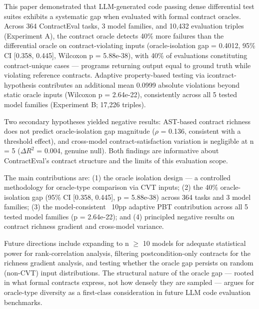
This paper demonstrated that LLM-generated code passing dense differential test suites exhibits a systematic gap when evaluated with formal contract oracles. Across 364 ContractEval tasks, 3 model families, and 10,432 evaluation triples (Experiment A), the contract oracle detects 40\% more failures than the differential oracle on contract-violating inputs (oracle-isolation gap = 0.4012, 95\% CI [0.358, 0.445], Wilcoxon p = 5.88e-38), with 40\% of evaluations constituting contract-unique cases --- programs returning output equal to ground truth while violating reference contracts. Adaptive property-based testing via icontract-hypothesis contributes an additional mean 0.0999 absolute violations beyond static oracle inputs (Wilcoxon p = 2.64e-22), consistently across all 5 tested model families (Experiment B; 17,226 triples).

Two secondary hypotheses yielded negative results: AST-based contract richness does not predict oracle-isolation gap magnitude ($\rho$ = 0.136, consistent with a threshold effect), and cross-model contract-satisfaction variation is negligible at n = 5 ($\Delta R^2$ = 0.004, genuine null). Both findings are informative about ContractEval's contract structure and the limits of this evaluation scope.

The main contributions are: (1) the oracle isolation design --- a controlled methodology for oracle-type comparison via CVT inputs; (2) the 40\% oracle-isolation gap (95\% CI [0.358, 0.445], p = 5.88e-38) across 364 tasks and 3 model families; (3) the model-consistent ~10pp adaptive PBT contribution across all 5 tested model families (p = 2.64e-22); and (4) principled negative results on contract richness gradient and cross-model variance.

Future directions include expanding to n $\geq$ 10 models for adequate statistical power for rank-correlation analysis, filtering postcondition-only contracts for the richness gradient analysis, and testing whether the oracle gap persists on random (non-CVT) input distributions. The structural nature of the oracle gap --- rooted in what formal contracts express, not how densely they are sampled --- argues for oracle-type diversity as a first-class consideration in future LLM code evaluation benchmarks.

